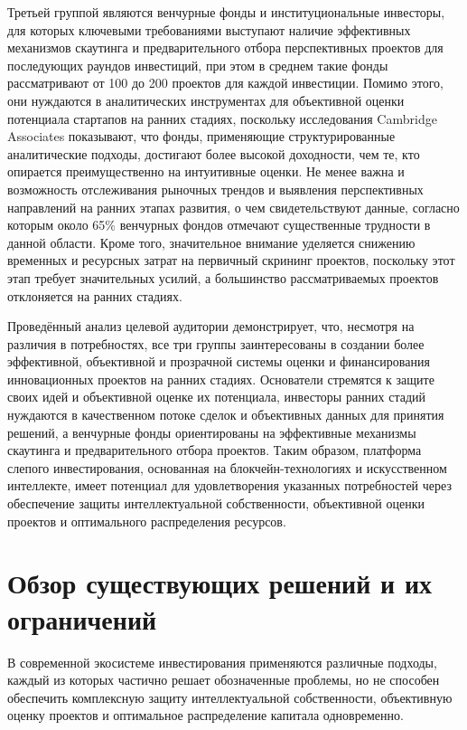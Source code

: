 \documentclass[
    candidate, %
    subf, %
    dotsinheaders=false,
]{disser}
\begin{document}
Третьей группой являются венчурные фонды и институциональные инвесторы, для которых ключевыми требованиями выступают наличие эффективных механизмов скаутинга и предварительного отбора перспективных проектов для последующих раундов инвестиций, при этом в среднем такие фонды рассматривают от 100 до 200 проектов для каждой инвестиции. Помимо этого, они нуждаются в аналитических инструментах для объективной оценки потенциала стартапов на ранних стадиях, поскольку исследования Cambridge Associates показывают, что фонды, применяющие структурированные аналитические подходы, достигают более высокой доходности, чем те, кто опирается преимущественно на интуитивные оценки. Не менее важна и возможность отслеживания рыночных трендов и выявления перспективных направлений на ранних этапах развития, о чем свидетельствуют данные, согласно которым около 65\% венчурных фондов отмечают существенные трудности в данной области. Кроме того, значительное внимание уделяется снижению временных и ресурсных затрат на первичный скрининг проектов, поскольку этот этап требует значительных усилий, а большинство рассматриваемых проектов отклоняется на ранних стадиях.

Проведённый анализ целевой аудитории демонстрирует, что, несмотря на различия в потребностях, все три группы заинтересованы в создании более эффективной, объективной и прозрачной системы оценки и финансирования инновационных проектов на ранних стадиях. Основатели стремятся к защите своих идей и объективной оценке их потенциала, инвесторы ранних стадий нуждаются в качественном потоке сделок и объективных данных для принятия решений, а венчурные фонды ориентированы на эффективные механизмы скаутинга и предварительного отбора проектов. Таким образом, платформа слепого инвестирования, основанная на блокчейн-технологиях и искусственном интеллекте, имеет потенциал для удовлетворения указанных потребностей через обеспечение защиты интеллектуальной собственности, объективной оценки проектов и оптимального распределения ресурсов.

\section{Обзор существующих решений и их ограничений}

В современной экосистеме инвестирования применяются различные подходы, каждый из которых частично решает обозначенные проблемы, но не способен обеспечить комплексную защиту интеллектуальной собственности, объективную оценку проектов и оптимальное распределение капитала одновременно.
\end{document}
